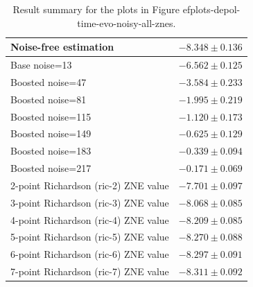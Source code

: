 \begin{table}
\caption{Result summary for the plots in Figure 
ef{plots-depol-time-evo-noisy-all-znes}.}
\begin{tabular*}{\textwidth}{@{\extracolsep{\fill}}ll@{}}
\toprule

Noise-free estimation & $-8.348 \pm 0.136$ \\
\midrule
Base noise=13 & $-6.562 \pm 0.125$ \\
Boosted noise=47 & $-3.584 \pm 0.233$ \\
Boosted noise=81 & $-1.995 \pm 0.219$ \\
Boosted noise=115 & $-1.120 \pm 0.173$ \\
Boosted noise=149 & $-0.625 \pm 0.129$ \\
Boosted noise=183 & $-0.339 \pm 0.094$ \\
Boosted noise=217 & $-0.171 \pm 0.069$ \\
\midrule
2-point Richardson (ric-2) ZNE value & $-7.701 \pm 0.097$ \\
3-point Richardson (ric-3) ZNE value & $-8.068 \pm 0.085$ \\
4-point Richardson (ric-4) ZNE value & $-8.209 \pm 0.085$ \\
5-point Richardson (ric-5) ZNE value & $-8.270 \pm 0.088$ \\
6-point Richardson (ric-6) ZNE value & $-8.297 \pm 0.091$ \\
7-point Richardson (ric-7) ZNE value & $-8.311 \pm 0.092$ \\
\bottomrule
\end{tabular*}
\label{table-depol-noise-free-time-evo}
\end{table}
